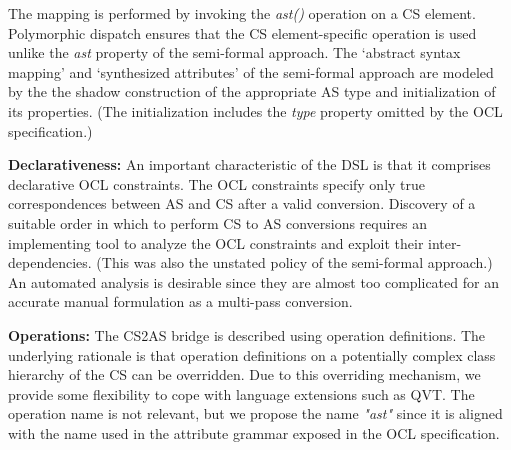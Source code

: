 \documentclass{llncs}
\begin{document}
The mapping is performed by invoking the \emph{ast()} operation on a CS element. Polymorphic dispatch ensures that the CS element-specific operation is used unlike the \emph{ast} property of the semi-formal approach. The `abstract syntax mapping' and `synthesized attributes' of the semi-formal approach are modeled by the the shadow construction of the appropriate AS type and initialization of its properties. (The initialization includes the \emph{type} property omitted by the OCL specification.)



\textbf{Declarativeness:} An important characteristic of the DSL is that it comprises declarative OCL constraints. The OCL constraints specify only true correspondences between AS and CS after a valid conversion. Discovery of a suitable order in which to perform CS to AS conversions requires an implementing tool to analyze the OCL constraints and exploit their inter-dependencies. (This was also the unstated policy of the semi-formal approach.) An automated analysis is desirable since they are almost too complicated for an accurate manual formulation as a multi-pass conversion.

\textbf{Operations:} The CS2AS bridge is described using operation definitions. The underlying rationale is that operation definitions on a potentially complex class hierarchy of the CS can be overridden. Due to this overriding mechanism, we provide some flexibility to cope with language extensions such as QVT. The operation name is not relevant, but we propose the name \emph{"ast"} since it is aligned with the name used in the attribute grammar exposed in the OCL specification.
\end{document}
